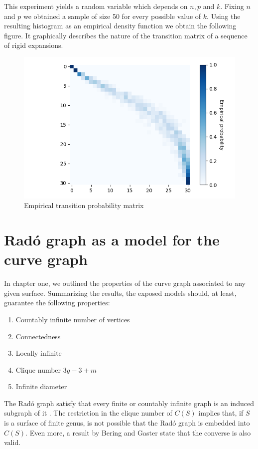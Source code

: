 This experiment yields a random variable which depends on $n, p$ and $k$. Fixing $n$ and $p$ we obtained a sample of size 50 for every possible value of $k$. Using the resulting histogram as an empirical density function we obtain the following figure. It graphically describes the nature of the transition matrix of a sequence of rigid expansions.

\begin{figure}[h!]
	\centering
	\includegraphics[scale=0.7]{Python/Figures/Transition-matrix-secuence-of-rigid-expansions.png}
	\caption{Empirical transition probability matrix}
\end{figure}

\section{Radó graph as a model for the curve graph}

In chapter one, we outlined the properties of the curve graph associated to any given surface. Summarizing the results, the exposed models should, at least, guarantee the following properties:

\begin{enumerate}
\item Countably infinite number of vertices
\item Connectedness
\item Locally infinite
\item Clique number $3g-3+m$
\item Infinite diameter
\end{enumerate}

The Radó graph satisfy that every finite or countably infinite graph is an induced subgraph of it \cite[Cameron 97]{theRandomGraph}. The restriction in the clique number of $C(S)$ implies that, if $S$ is a surface of finite genus, is not possible that the Radó graph is embedded into $C(S)$. Even more, a result by Bering and Gaster \cite[Bering, Gaster 17]{beringGaster} state that the converse is also valid.

